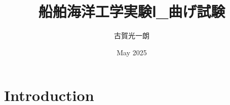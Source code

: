 \documentclass{article}
\title{船舶海洋工学実験Ⅰ_曲げ試験}
\author{古賀光一朗}
\date{May 2025}
\begin{document}
\maketitle

\section{Introduction}
\end{document}

